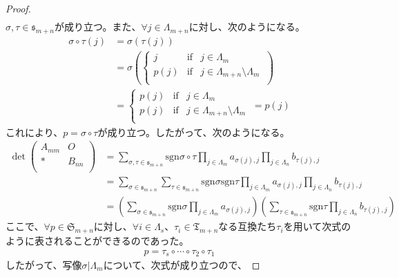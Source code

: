 \documentclass[dvipdfmx]{jsarticle}
\begin{document}
\begin{proof}
\begin{align*}
\end{align*}
$\sigma,\tau \in \mathfrak{s}_{m + n}$が成り立つ。また、$\forall j \in \varLambda_{m + n}$に対し、次のようになる。
\begin{align*}
\sigma \circ \tau(j) &= \sigma\left( \tau(j) \right)\\
&= \sigma\left( \left\{ \begin{matrix}
j & \mathrm{if} & j \in \varLambda_{m} \\
p(j) & \mathrm{if} & j \in \varLambda_{m + n} \setminus \varLambda_{m} \\
\end{matrix} \right.\  \right)\\
&= \left\{ \begin{matrix}
p(j) & \mathrm{if} & j \in \varLambda_{m} \\
p(j) & \mathrm{if} & j \in \varLambda_{m + n} \setminus \varLambda_{m} \\
\end{matrix} \right.\  = p(j)
\end{align*}
これにより、$p = \sigma \circ \tau$が成り立つ。したがって、次のようになる。
\begin{align*}
\det\begin{pmatrix}
A_{mm} & O \\
* & B_{nn} \\
\end{pmatrix} &= \sum_{\sigma,\tau \in \mathfrak{s}_{m + n}} {{\mathrm{sgn} }{\sigma \circ \tau}\prod_{j \in \varLambda_{m}} a_{\sigma(j),j}\prod_{j \in \varLambda_{n}} b_{\tau(j),j}}\\
&= \sum_{\sigma \in \mathfrak{s}_{m + n}} {\sum_{\tau \in \mathfrak{s}_{m + n}} {{\mathrm{sgn} }\sigma{\mathrm{sgn} }\tau\prod_{j \in \varLambda_{m}} a_{\sigma(j),j}\prod_{j \in \varLambda_{n}} b_{\tau(j),j}}}\\
&= \left( \sum_{\sigma \in \mathfrak{s}_{m + n}} {{\mathrm{sgn} }\sigma\prod_{j \in \varLambda_{m}} a_{\sigma(j),j}} \right)\left( \sum_{\tau \in \mathfrak{s}_{m + n}} {{\mathrm{sgn} }\tau\prod_{j \in \varLambda_{n}} b_{\tau(j),j}} \right)
\end{align*}
ここで、$\forall p \in \mathfrak{S}_{m + n}$に対し、$\forall i \in \varLambda_{s}$、$\tau_{i} \in \mathfrak{T}_{m + n}$なる互換たち$\tau_{i}$を用いて次式のように表されることができるのであった。
\begin{align*}
p = \tau_{s} \circ \cdots \circ \tau_{2} \circ \tau_{1}
\end{align*}
したがって、写像$\sigma|\varLambda_{m}$について、次式が成り立つので、

\end{proof}
\end{document}
